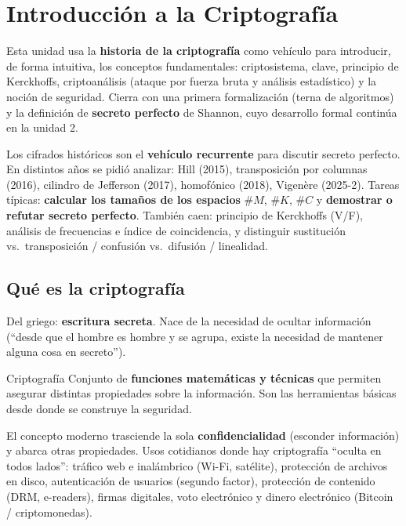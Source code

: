 \documentclass[../main.tex]{subfiles}
\begin{document}
\section{Introducción a la Criptografía}

Esta unidad usa la \textbf{historia de la criptografía} como vehículo para
introducir, de forma intuitiva, los conceptos fundamentales: criptosistema,
clave, principio de Kerckhoffs, criptoanálisis (ataque por fuerza bruta y
análisis estadístico) y la noción de seguridad. Cierra con una primera
formalización (terna de algoritmos) y la definición de \textbf{secreto
perfecto} de Shannon, cuyo desarrollo formal continúa en la unidad 2.


\begin{examen}
Los cifrados históricos son el \textbf{vehículo recurrente} para discutir
secreto perfecto. En distintos años se pidió analizar: Hill (2015),
transposición por columnas (2016), cilindro de Jefferson (2017), homofónico
(2018), Vigenère (2025-2). Tareas típicas: \textbf{calcular los tamaños de los
espacios} $\#M$, $\#K$, $\#C$ y \textbf{demostrar o refutar secreto perfecto}.
También caen: principio de Kerckhoffs (V/F), análisis de frecuencias e índice
de coincidencia, y distinguir sustitución vs.\ transposición / confusión vs.\
difusión / linealidad.
\end{examen}

\subsection{Qué es la criptografía}

Del griego: \textbf{escritura secreta}. Nace de la necesidad de ocultar
información (``desde que el hombre es hombre y se agrupa, existe la necesidad de
mantener alguna cosa en secreto'').

\begin{definicion}{Criptografía}
Conjunto de \textbf{funciones matemáticas y técnicas} que permiten asegurar
distintas propiedades sobre la información. Son las herramientas básicas desde
donde se construye la seguridad.
\end{definicion}

El concepto moderno trasciende la sola \textbf{confidencialidad} (esconder
información) y abarca otras propiedades. Usos cotidianos donde hay criptografía
``oculta en todos lados'': tráfico web e inalámbrico (Wi-Fi, satélite),
protección de archivos en disco, autenticación de usuarios (segundo factor),
protección de contenido (DRM, e-readers), firmas digitales, voto electrónico y
dinero electrónico (Bitcoin / criptomonedas).
\end{document}
